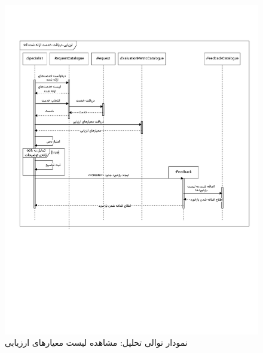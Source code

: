\begin{figure}[ht!]
	\centering
	\includegraphics[scale=0.8, page=2]{figs/OOD-Sequence-3.pdf}
	\caption{نمودار توالی تحلیل: مشاهده لیست معیارهای ارزیابی}
\end{figure}
\FloatBarrier
\newpage

